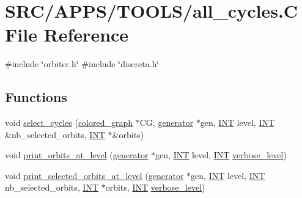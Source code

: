 \hypertarget{all__cycles_8_c}{}\section{S\+R\+C/\+A\+P\+P\+S/\+T\+O\+O\+L\+S/all\+\_\+cycles.C File Reference}
\label{all__cycles_8_c}
{\ttfamily \#include \char`\"{}orbiter.\+h\char`\"{}}\newline
{\ttfamily \#include \char`\"{}discreta.\+h\char`\"{}}\newline
\subsection*{Functions}
\begin{DoxyCompactItemize}
\item 
void \mbox{\hyperlink{all__cycles_8_c_a0af9145868def351bff5cb923f4d72b4}{select\+\_\+cycles}} (\mbox{\hyperlink{classcolored__graph}{colored\+\_\+graph}} $\ast$CG, \mbox{\hyperlink{classgenerator}{generator}} $\ast$gen, \mbox{\hyperlink{galois_8h_a09fddde158a3a20bd2dcadb609de11dc}{I\+NT}} level, \mbox{\hyperlink{galois_8h_a09fddde158a3a20bd2dcadb609de11dc}{I\+NT}} \&nb\+\_\+selected\+\_\+orbits, \mbox{\hyperlink{galois_8h_a09fddde158a3a20bd2dcadb609de11dc}{I\+NT}} $\ast$\&orbits)
\item 
void \mbox{\hyperlink{all__cycles_8_c_a0f75338604b3e69ac0915f7fcd122ec7}{print\+\_\+orbits\+\_\+at\+\_\+level}} (\mbox{\hyperlink{classgenerator}{generator}} $\ast$gen, \mbox{\hyperlink{galois_8h_a09fddde158a3a20bd2dcadb609de11dc}{I\+NT}} level, \mbox{\hyperlink{galois_8h_a09fddde158a3a20bd2dcadb609de11dc}{I\+NT}} \mbox{\hyperlink{simeon_8_c_a818073fbcc2f439e7c56952f67386122}{verbose\+\_\+level}})
\item 
void \mbox{\hyperlink{all__cycles_8_c_a9e3a033210b11f8f167631c923ff419a}{print\+\_\+selected\+\_\+orbits\+\_\+at\+\_\+level}} (\mbox{\hyperlink{classgenerator}{generator}} $\ast$gen, \mbox{\hyperlink{galois_8h_a09fddde158a3a20bd2dcadb609de11dc}{I\+NT}} level, \mbox{\hyperlink{galois_8h_a09fddde158a3a20bd2dcadb609de11dc}{I\+NT}} nb\+\_\+selected\+\_\+orbits, \mbox{\hyperlink{galois_8h_a09fddde158a3a20bd2dcadb609de11dc}{I\+NT}} $\ast$orbits, \mbox{\hyperlink{galois_8h_a09fddde158a3a20bd2dcadb609de11dc}{I\+NT}} \mbox{\hyperlink{simeon_8_c_a818073fbcc2f439e7c56952f67386122}{verbose\+\_\+level}})
\item 

\end{DoxyCompactItemize}
